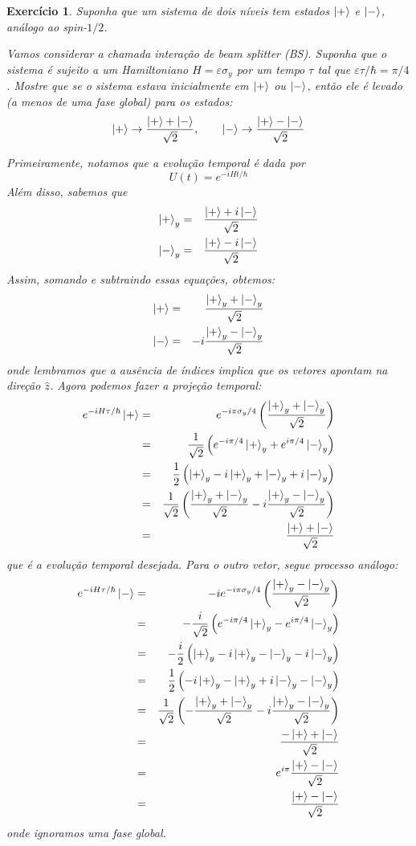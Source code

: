 \documentclass[12pt]{article}
\def\be{\begin{equation}}
\def\ee{\end{equation}}
\def\bea{\begin{eqnarray*}}
\def\eea{\end{eqnarray*}}
\def\f{\frac}
\def\l{\left}
\def\r{\right}
\newtheorem{exercise}{Exercício}
\begin{document}
	\begin{exercise}
		Suponha que um sistema de dois níveis tem estados $\ket{+}$ e $\ket{-}$, análogo ao spin-$1/2$. 
		\begin{exercises}
			\item Vamos considerar a chamada interação de beam splitter (BS). Suponha que o
			sistema é sujeito a um Hamiltoniano $H=\varepsilon\sigma_y$ por um tempo $\tau$ tal que $\varepsilon\tau/\hbar = \pi/4$. Mostre que se o sistema estava inicialmente em $\ket{+}$ ou $\ket{-}$, então ele é levado (a menos de uma fase global) para os estados:
			\be
				\ket{+} \to \f{\ket{+}+\ket{-}}{\sqrt{2}}, \quad\quad \ket{-} \to \f{\ket{+} - \ket{-}}{\sqrt{2}}
			\ee
			\begin{multianswer}
				Primeiramente, notamos que a evolução temporal é dada por
				\be
					U(t) = e^{-iHt/\hbar}
				\ee
				Além disso, sabemos que
				\bea
					\ket{+}_y &=& \f{\ket{+} + i\ket{-}}{\sqrt{2}} \\
					\ket{-}_y &=& \f{\ket{+} - i\ket{-}}{\sqrt{2}} 
				\eea
				Assim, somando e subtraindo essas equações, obtemos:
				\bea
					\ket{+} &=& \f{\ket{+}_y + \ket{-}_y}{\sqrt{2}} \\
					\ket{-} &=& -i \f{\ket{+}_y - \ket{-}_y}{\sqrt{2}} 
				\eea	
				onde lembramos que a ausência de índices implica que os vetores apontam na direção $\hat{z}$. Agora podemos fazer a projeção temporal:
				\bea
					e^{-iH\tau/\hbar}\ket{+} &=& e^{-i\pi\sigma_y/4} \l( \f{\ket{+}_y + \ket{-}_y}{\sqrt{2}}\r) \\
						&=& \f{1}{\sqrt{2}} \l( e^{-i\pi/4}\ket{+}_y + e^{i\pi/4}\ket{-}_y \r) \\
						&=& \f{1}{2} \l( \ket{+}_y - i\ket{+}_y + \ket{-}_y +i\ket{-}_y \r) \\
						&=& \f{1}{\sqrt{2}} \l( \f{\ket{+}_y + \ket{-}_y}{\sqrt{2}} -i \f{ \ket{+}_y - \ket{-}_y}{\sqrt{2}} \r) \\
						&=& \f{\ket{+} + \ket{-}}{\sqrt{2}} 
				\eea
				que é a evolução temporal desejada. Para o outro vetor, segue processo análogo:
				\bea
					e^{-iH\tau/\hbar}\ket{-} &=& -i e^{-i\pi\sigma_y/4} \l( \f{\ket{+}_y - \ket{-}_y}{\sqrt{2}}\r) \\	
						&=& -\f{i}{\sqrt{2}} \l( e^{-i\pi/4}\ket{+}_y - e^{i\pi/4}\ket{-}_y \r) \\
						&=& -\f{i}{2} \l( \ket{+}_y - i\ket{+}_y - \ket{-}_y - i\ket{-}_y \r) \\
						&=& \f{1}{2} \l( -i\ket{+}_y - \ket{+}_y + i\ket{-}_y - \ket{-}_y \r) \\
						&=& \f{1}{\sqrt{2}} \l( - \f{\ket{+}_y + \ket{-}_y}{\sqrt{2}} -i \f{\ket{+}_y - \ket{-}_y}{\sqrt{2}} \r) \\
						&=& \f{-\ket{+} + \ket{-}}{\sqrt{2}} \\
						&=& e^{i\pi} \f{\ket{+} - \ket{-}}{\sqrt{2}} \\
						&=& \f{\ket{+} - \ket{-}}{\sqrt{2}} 
				\eea
				onde ignoramos uma fase global. 
			\end{multianswer}
			

\end{exercises}
\end{exercise}
\end{document}
